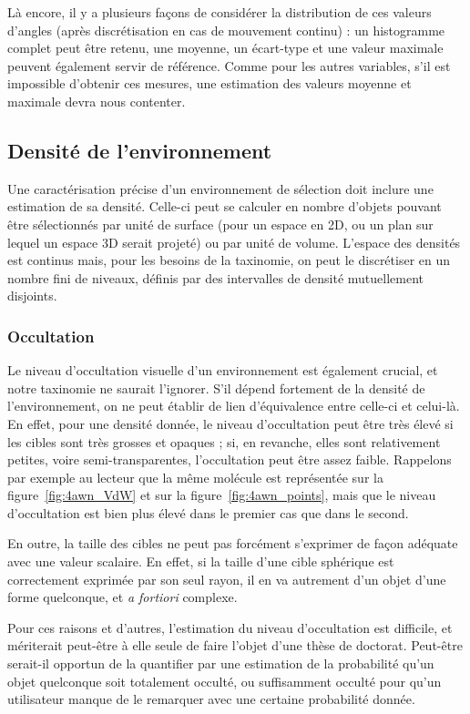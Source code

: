	Là encore, il y a plusieurs façons de considérer la distribution de ces valeurs d'angles (après discrétisation en cas de mouvement continu) : un histogramme complet peut être retenu, une moyenne, un écart-type et une valeur maximale peuvent également servir de référence. Comme pour les autres variables, s'il est impossible d'obtenir ces mesures, une estimation des valeurs moyenne et maximale devra nous contenter.

    \subsection{Densité de l'environnement}
    Une caractérisation précise d'un environnement de sélection doit inclure une estimation de sa densité. Celle-ci peut se calculer en nombre d'objets pouvant être sélectionnés par unité de surface (pour un espace en 2D, ou un plan sur lequel un espace 3D serait projeté) ou par unité de volume. L'espace des densités est continus mais, pour les besoins de la taxinomie, on peut le discrétiser en un nombre fini de niveaux, définis par des intervalles de densité mutuellement disjoints.
    
    \subsubsection{Occultation}
    Le niveau d'occultation visuelle d'un environnement est également crucial, et notre taxinomie ne saurait l'ignorer. S'il dépend fortement de la densité de l'environnement, on ne peut établir de lien d'équivalence entre celle-ci et celui-là. En effet, pour une densité donnée, le niveau d'occultation peut être très élevé si les cibles sont très grosses et opaques ; si, en revanche, elles sont relativement petites, voire semi-transparentes, l'occultation peut être assez faible. Rappelons par exemple au lecteur que la même molécule est représentée sur la figure~\ref{fig:4awn_VdW} et sur la figure~\ref{fig:4awn_points}, mais que le niveau d'occultation est bien plus élevé dans le premier cas que dans le second.
	
    En outre, la \og taille \fg{} des cibles ne peut pas forcément s'exprimer de façon adéquate avec une valeur scalaire. En effet, si la taille d'une cible sphérique est correctement exprimée par son seul rayon, il en va autrement d'un objet d'une forme quelconque, et \emph{a fortiori} complexe.
    
    Pour ces raisons et d'autres, l'estimation du niveau d'occultation est difficile, et mériterait peut-être à elle seule de faire l'objet d'une thèse de doctorat. Peut-être serait-il opportun de la quantifier par une estimation de la probabilité qu'un objet quelconque soit totalement occulté, ou suffisamment occulté pour qu'un utilisateur manque de le remarquer avec une certaine probabilité donnée.
    
